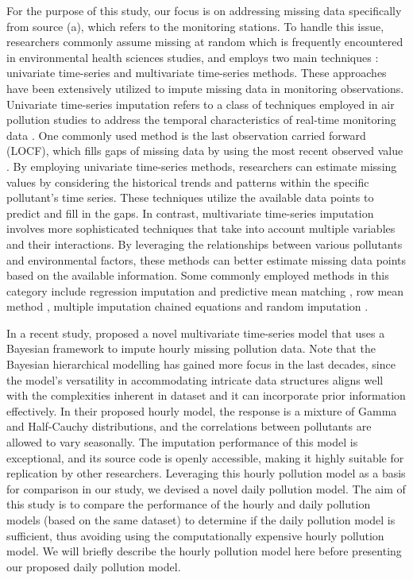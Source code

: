 \documentclass[
  12,
]{article}
\begin{document}
For the purpose of this study, our focus is on addressing missing data
specifically from source (a), which refers to the monitoring stations.
To handle this issue, researchers commonly assume missing at random
\autocite[MAR, see e.g.,][]{Little2019} which is frequently encountered
in environmental health sciences studies, and employs two main
techniques \autocite{Hadeed2020}: univariate time-series and
multivariate time-series methods. These approaches have been extensively
utilized to impute missing data in monitoring observations. Univariate
time-series imputation refers to a class of techniques employed in air
pollution studies to address the temporal characteristics of real-time
monitoring data \autocite{Moritz2015}. One commonly used method is the
last observation carried forward (LOCF), which fills gaps of missing
data by using the most recent observed value
\autocite{Engels2003,Plaia2006}. By employing univariate time-series
methods, researchers can estimate missing values by considering the
historical trends and patterns within the specific pollutant's time
series. These techniques utilize the available data points to predict
and fill in the gaps. In contrast, multivariate time-series imputation
involves more sophisticated techniques that take into account multiple
variables and their interactions. By leveraging the relationships
between various pollutants and environmental factors, these methods can
better estimate missing data points based on the available information.
Some commonly employed methods in this category include regression
imputation and predictive mean matching \autocites[PMM, see
e.g.,][]{Rubin1986,Little1988}, row mean method \autocite[RMM, see
e.g.,][]{Engels2003} , multiple imputation chained equations
\autocite[MICE, see e.g.,][]{Rubin1988} and random imputation
\autocite{Moritz2015}.

In a recent study, \textcite{Huang2022} proposed a novel multivariate
time-series model that uses a Bayesian framework to impute hourly
missing pollution data. Note that the Bayesian hierarchical modelling
has gained more focus in the last decades, since the model's versatility
in accommodating intricate data structures aligns well with the
complexities inherent in dataset and it can incorporate prior
information effectively. In their proposed hourly model, the response is
a mixture of Gamma and Half-Cauchy distributions, and the correlations
between pollutants are allowed to vary seasonally. The imputation
performance of this model is exceptional, and its source code is openly
accessible, making it highly suitable for replication by other
researchers. Leveraging this hourly pollution model as a basis for
comparison in our study, we devised a novel daily pollution model. The
aim of this study is to compare the performance of the hourly and daily
pollution models (based on the same dataset) to determine if the daily
pollution model is sufficient, thus avoiding using the computationally
expensive hourly pollution model. We will briefly describe the hourly
pollution model here \autocite[more details can be found
in][]{Huang2022} before presenting our proposed daily pollution model.
\end{document}
